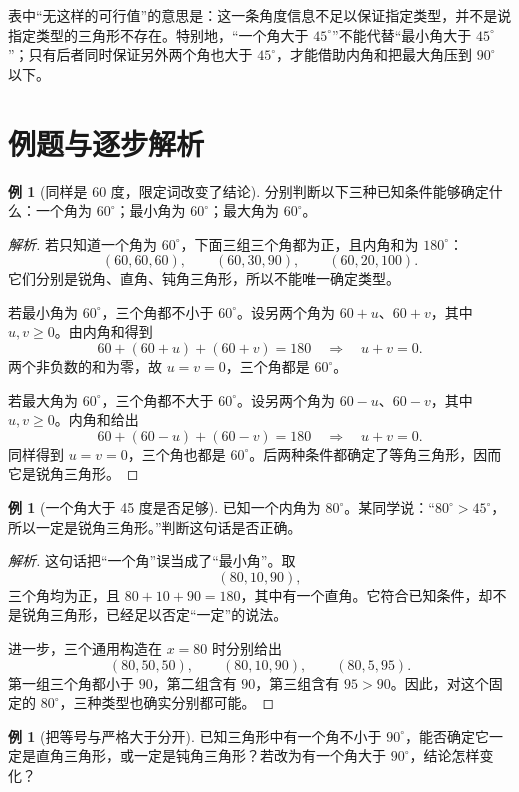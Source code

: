 \documentclass[UTF8,a4paper,zihao=-4,oneside,openany,fontset=fandol]{ctexbook}
\theoremstyle{definition}
\newtheorem{example}[theorem]{例}
\theoremstyle{remark}
\begin{document}
表中“无这样的可行值”的意思是：这一条角度信息不足以保证指定类型，并不是说指定类型的三角形不存在。特别地，“一个角大于 $45^\circ$”不能代替“最小角大于 $45^\circ$”；只有后者同时保证另外两个角也大于 $45^\circ$，才能借助内角和把最大角压到 $90^\circ$ 以下。

\section{例题与逐步解析}

\begin{example}[同样是 60 度，限定词改变了结论]
分别判断以下三种已知条件能够确定什么：一个角为 $60^\circ$；最小角为 $60^\circ$；最大角为 $60^\circ$。
\end{example}

\begin{proof}[解析]
若只知道一个角为 $60^\circ$，下面三组三个角都为正，且内角和为 $180^\circ$：
\[
(60,60,60),\qquad(60,30,90),\qquad(60,20,100).
\]
它们分别是锐角、直角、钝角三角形，所以不能唯一确定类型。

若最小角为 $60^\circ$，三个角都不小于 $60^\circ$。设另两个角为 $60+u$、$60+v$，其中 $u,v\ge0$。由内角和得到
\[
60+(60+u)+(60+v)=180
\quad\Longrightarrow\quad u+v=0.
\]
两个非负数的和为零，故 $u=v=0$，三个角都是 $60^\circ$。

若最大角为 $60^\circ$，三个角都不大于 $60^\circ$。设另两个角为 $60-u$、$60-v$，其中 $u,v\ge0$。内角和给出
\[
60+(60-u)+(60-v)=180
\quad\Longrightarrow\quad u+v=0.
\]
同样得到 $u=v=0$，三个角也都是 $60^\circ$。后两种条件都确定了等角三角形，因而它是锐角三角形。
\end{proof}

\begin{example}[一个角大于 45 度是否足够]
已知一个内角为 $80^\circ$。某同学说：“$80^\circ>45^\circ$，所以一定是锐角三角形。”判断这句话是否正确。
\end{example}

\begin{proof}[解析]
这句话把“一个角”误当成了“最小角”。取
\[
(80,10,90),
\]
三个角均为正，且 $80+10+90=180$，其中有一个直角。它符合已知条件，却不是锐角三角形，已经足以否定“一定”的说法。

进一步，三个通用构造在 $x=80$ 时分别给出
\[
(80,50,50),\qquad(80,10,90),\qquad(80,5,95).
\]
第一组三个角都小于 $90$，第二组含有 $90$，第三组含有 $95>90$。因此，对这个固定的 $80^\circ$，三种类型也确实分别都可能。
\end{proof}

\begin{example}[把等号与严格大于分开]
已知三角形中有一个角不小于 $90^\circ$，能否确定它一定是直角三角形，或一定是钝角三角形？若改为有一个角大于 $90^\circ$，结论怎样变化？
\end{example}
\end{document}
